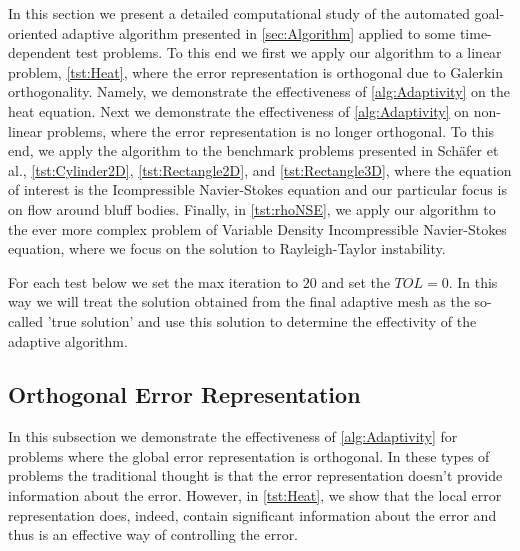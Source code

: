 In this section we present a detailed computational study of the automated
goal-oriented adaptive algorithm presented in \autoref{sec:Algorithm} applied to
some time-dependent test problems. To this end we first we apply our algorithm
to a linear problem, \autoref{tst:Heat}, where the error representation is
orthogonal due to Galerkin orthogonality. Namely, we demonstrate the
effectiveness of \autoref{alg:Adaptivity} on the heat equation. Next we
demonstrate the effectiveness of \autoref{alg:Adaptivity} on non-linear
problems, where the error representation is no longer orthogonal. To this end,
we apply the algorithm to the benchmark problems presented in Sch\"afer et
al.\cite{Schaefer1996}, \autoref{tst:Cylinder2D}, \autoref{tst:Rectangle2D}, and
\autoref{tst:Rectangle3D}, where the equation of interest is the Icompressible
Navier-Stokes equation and our particular focus is on flow around bluff bodies.
Finally, in \autoref{tst:rhoNSE}, we apply our algorithm to the ever more
complex problem of Variable Density Incompressible Navier-Stokes equation, where
we focus on the solution to Rayleigh-Taylor instability.

For each test below we set the max iteration to $20$ and set the $TOL=0$. In
this way we will treat the solution obtained from the final adaptive mesh as the
so-called 'true solution' and use this solution to determine the effectivity of
the adaptive algorithm.

\subsection{Orthogonal Error Representation}
In this subsection we demonstrate the effectiveness of \autoref{alg:Adaptivity}
for problems where the global error representation is orthogonal. In these types
of problems the traditional thought is that the error representation doesn't
provide information about the error. However, in \autoref{tst:Heat}, we show
that the local error representation does, indeed, contain significant
information about the error and thus is an effective way of controlling the
error.

